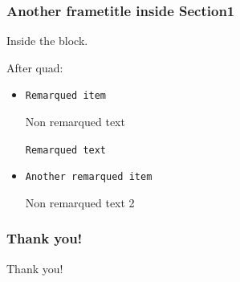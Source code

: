 \documentclass[10pt]{beamer}
\begin{document}
\begin{frame}
\frametitle{Another frametitle inside Section1}


\begin{block}{}
Inside the block.
\end{block}


\quad


After quad:

\begin{itemize}

\item {\tt Remarqued item}

Non remarqued text

{\tt Remarqued text} 

 \item {\tt Another remarqued item}

Non remarqued text 2 

\end{itemize}

\end{frame}






\begin{frame}

\frametitle{Thank you!}


\begin{center}
Thank you!
\end{center}




\end{frame}

\end{document}

